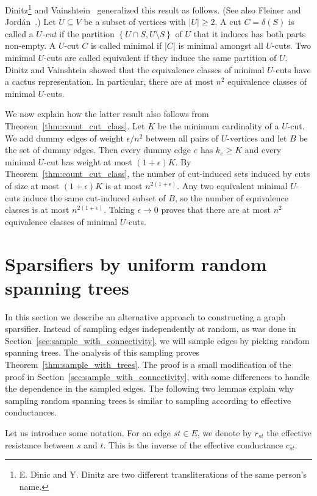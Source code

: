 \documentclass[11pt]{article}
\numberwithin{equation}{section}
\newcommand{\newterm}[1]{\textit{#1}}
\newcommand{\intersect}{\cap}
\newcommand{\abs}[1]{\lvert #1 \rvert}
\newcommand{\card}[1]{\abs{#1}}
\newcommand{\set}[1]{\left \{ #1 \right \}}                     \newcommand{\setst}[2]{\left\{\; #1 \,:\, #2 \;\right\}}
\newcommand{\Section}[1]{Section~\ref{sec:#1}}
\newcommand{\Theorem}[1]{Theorem~\ref{thm:#1}}
\begin{document}
Dinitz\footnote{E. Dinic and Y. Dinitz are two different transliterations of the same person's name.}
and Vainshtein~\cite{DVConf,DV} generalized this result as follows.
(See also Fleiner and Jord\'an~\cite{FleinerJordan}.)
Let $U \subseteq V$ be a subset of vertices with $\card{U} \geq 2$.
A cut $C = \delta(S)$ is called a \newterm{$U$-cut} if 
the partition $\set{ U \intersect S, U \setminus S }$ of $U$ that it induces
has both parts non-empty.
A $U$-cut $C$ is called minimal if $\card{C}$ is minimal amongst all $U$-cuts.
Two minimal $U$-cuts are called equivalent if they induce the same partition of $U$.
Dinitz and Vainshtein showed that the equivalence classes of minimal $U$-cuts have
a cactus representation.
In particular, there are at most $n^2$ equivalence classes of minimal $U$-cuts.

We now explain how the latter result also follows from \Theorem{count_cut_class}.
Let $K$ be the minimum cardinality of a $U$-cut.
We add dummy edges of weight $\epsilon/n^2$ between all pairs of $U$-vertices
and let $B$ be the set of dummy edges.
Then every dummy edge $e$ has $k_e \geq K$ and every minimal $U$-cut has weight at most
$(1+\epsilon) K$.
By \Theorem{count_cut_class}, the number of cut-induced sets induced by
cuts of size at most $(1+\epsilon)K$ is at most $n^{2(1+\epsilon)}$.
Any two equivalent minimal $U$-cuts induce the same cut-induced subset of $B$,
so the number of equivalence classes is at most $n^{2(1+\epsilon)}$.
Taking $\epsilon \rightarrow 0$ proves that there are at most
$n^2$ equivalence classes of minimal $U$-cuts.



\section{Sparsifiers by uniform random spanning trees}
\label{sec:spanning_tree}

In this section we describe an alternative approach to constructing a graph sparsifier.
Instead of sampling edges independently at random, as was done in
\Section{sample_with_connectivity},
we will sample edges by picking random spanning trees.
The analysis of this sampling proves \Theorem{sample_with_trees}.
The proof is a small modification of the proof in \Section{sample_with_connectivity},
with some differences to handle the dependence in the sampled edges.
The following two lemmas explain why sampling random spanning trees
is similar to sampling according to effective conductances.

Let us introduce some notation.
For an edge $st\in E$, we denote by $r_{st}$ the effective resistance between $s$ and $t$.
This is the inverse of the effective conductance $c_{st}$.
\end{document}
